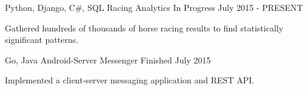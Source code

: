 

\begin{cventries}

  \cventry
    {Python, Django, C\#, SQL} %
    {Racing Analytics} %
    {In Progress} %
    {July 2015 - PRESENT} %
    {
      \begin{cvitems} %
        \item {Gathered hundreds of thousands of horse racing results to find statistically significant patterns.}
      \end{cvitems}
    }

  \cventry
    {Go, Java} %
    {Android-Server Messenger} %
    {Finished} %
    {July 2015} %
    {
      \begin{cvitems} %
        \item {Implemented a client-server messaging application and REST API.}
      \end{cvitems}
    }

\end{cventries}
